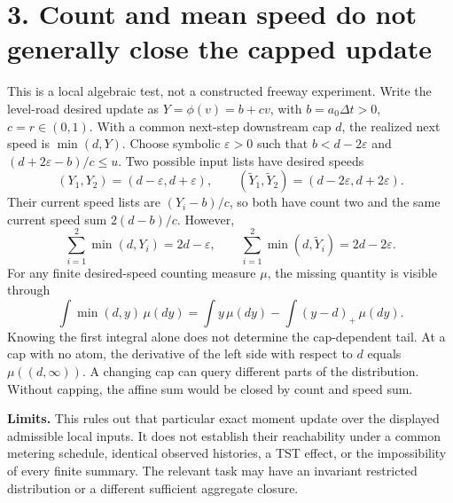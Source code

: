 \documentclass[11pt,a4paper]{article}
\begin{document}
\section*{3. Count and mean speed do not generally close the capped update}
This is a local algebraic test, not a constructed freeway experiment.
Write the level-road desired update as $Y=\phi(v)=b+cv$, with
$b=a_0\Delta t>0$, $c=r\in(0,1)$. With a common next-step downstream
cap $d$, the realized next speed is $\min(d,Y)$.
Choose symbolic $\varepsilon>0$ such that $b<d-2\varepsilon$ and
$(d+2\varepsilon-b)/c\le u$. Two possible input lists have desired speeds
\begin{equation}
 (Y_1,Y_2)=(d-\varepsilon,d+\varepsilon),\qquad
 (\widetilde Y_1,\widetilde Y_2)=(d-2\varepsilon,d+2\varepsilon).
\end{equation}
Their current speed lists are $(Y_i-b)/c$, so both have count two and
the same current speed sum $2(d-b)/c$. However,
\begin{equation}
 \sum_{i=1}^2\min(d,Y_i)=2d-\varepsilon,\qquad
 \sum_{i=1}^2\min(d,\widetilde Y_i)=2d-2\varepsilon.
\end{equation}
For any finite desired-speed counting measure $\mu$, the missing quantity is
visible through
\begin{equation}
 \int\min(d,y)\,\mu(dy)
 =\int y\,\mu(dy)-\int(y-d)_+\,\mu(dy).
\end{equation}
Knowing the first integral alone does not determine the cap-dependent tail.
At a cap with no atom, the derivative of the left side with respect to $d$
equals $\mu((d,\infty))$. A changing cap can query different parts of the
distribution. Without capping, the affine sum would be closed by count and
speed sum.

\textbf{Limits.} This rules out that particular exact moment update over the
displayed admissible local inputs. It does not establish their reachability
under a common metering schedule, identical observed histories, a TST effect,
or the impossibility of every finite summary. The relevant task may have an
invariant restricted distribution or a different sufficient aggregate closure.

\newpage
\end{document}
